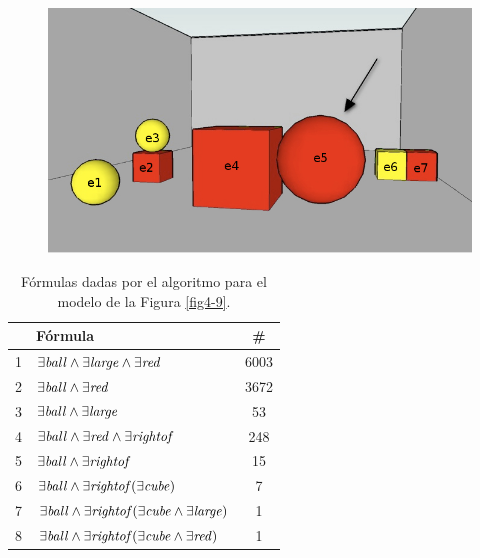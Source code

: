 \begin{figure}[h]
\centering
\includegraphics[width=\textwidth]{images/22.jpg}
\label{GRE3D7-stimulus-22-apendice}
\end{figure}


\label{formulas-gre3d7}
\begin{table}[h]
\begin{center}
\begin{tabular}{|l|l|c|}
\hline
&F\'ormula			      &  \# \\ \hline \hline

1&$\exists \mathit{ball} \land \exists \mathit{large} \land \exists \mathit{red}$		&6003 \\ \hline
2&$\exists \mathit{ball} \land \exists \mathit{red}$		&3672 \\ \hline
3&$\exists \mathit{ball} \land \exists \mathit{large}$		&53 \\ \hline
4&$\exists \mathit{ball} \land \exists \mathit{red} \land \exists \mathit{rightof}$	&	248 \\ \hline
5&$\exists \mathit{ball} \land \exists \mathit{rightof}$		&15 \\ \hline
6&$\exists \mathit{ball} \land \exists \mathit{rightof}(\exists \mathit{cube})$	&	7 \\ \hline
7&$\exists \mathit{ball} \land \exists \mathit{rightof}(\exists \mathit{cube} \land \exists \mathit{large})$&		1 \\ \hline
8&$\exists \mathit{ball} \land \exists \mathit{rightof}(\exists \mathit{cube} \land \exists \mathit{red})$		&1 \\ \hline

\end{tabular}

\caption{F\'ormulas dadas por el algoritmo para el modelo de la Figura \protect\ref{fig4-9}.}\label{formulas-mapa-gre3d7-apendice}
\end{center}
\end{table}


